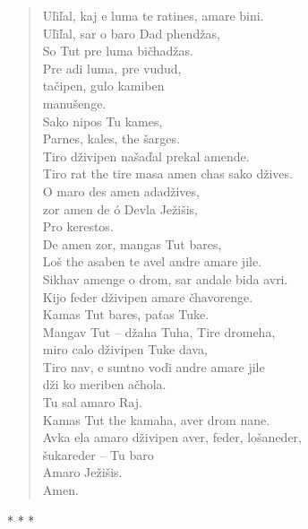 \begin{verse}
Uľiľal, kaj e luma te ratines, amare bini. \\
Uľiľal, sar o baro Dad phendžas, \\
So Tut pre luma bičhadžas. \\
Pre adi luma, pre vudud, \\
 tačipen, gulo kamiben \\
manušenge. \\
Sako nipos Tu kames, \\
Parnes, kales, the šarges. \\
Tiro dživipen našaďal prekal amende. \\
Tiro rat the tire masa amen chas sako džives. \\
O maro des amen adadžives,  \\
\hspace{\fill}zor amen de ó Devla Ježišis, \\
Pro kerestos. \\
De amen zor, mangas Tut bares, \\
Loš the asaben te avel andre amare jile.  \\
\hspace{\fill}Sikhav amenge o drom, sar andale bida avri.  \\
\hspace{\fill}Kijo feder dživipen amare čhavorenge. \\
Kamas Tut bares, paťas Tuke. \\
Mangav Tut – džaha Tuha, Tire dromeha,  \\
\hspace{\fill}miro calo dživipen Tuke dava, \\
Tiro nav, e suntno voďi andre amare jile  \\
\hspace{\fill}dži ko meriben ačhola. \\
Tu sal amaro Raj. \\
Kamas Tut the kamaha, aver drom nane. \\
Avka ela amaro dživipen aver, feder, lošaneder, \\
\hspace{\fill}šukareder -- Tu baro \\ 
Amaro Ježišis. \\
Amen.
\end{verse}

\begin{center}
* * *
\end{center}


